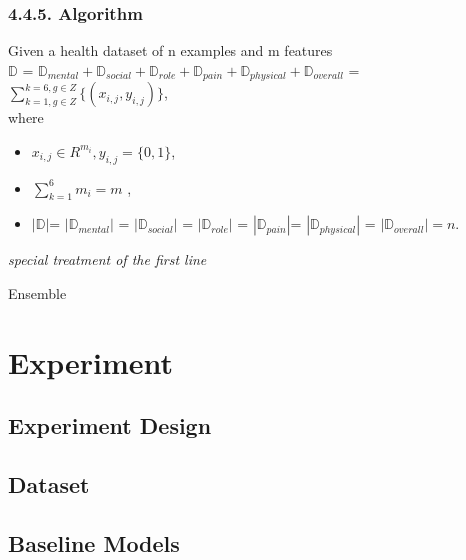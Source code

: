 \documentclass[runningheads]{llncs}
\begin{document}
\subsubsection{4.4.5. Algorithm}
%
Given a health dataset of n examples and m features \\
$\mathbb{D}$ = $\mathbb{D}_{mental} + \mathbb{D}_{social} + \mathbb{D}_{role} + \mathbb{D}_{pain} + \mathbb{D}_{physical} + \mathbb{D}_{overall}$ = $\displaystyle \sum_{k=1, g \in Z}^{k=6, g \in Z}  \big\{ (x_{i, j}, y_{i, j}) \big\}$, \\ where 
 \begin{itemize}
 	\item $ x_{i, j} \in R^{m_{i}}, y_{i, j} = \{0, 1\}$, 
 	\item $\displaystyle \sum_{k=1}^{6}m_{i} = m$ , 
	\item $ |\mathbb{D}| $= $|\mathbb{D}_{mental}|$ = $|\mathbb{D}_{social}|$ = $|\mathbb{D}_{role}|$ = $|\mathbb{D}_{pain}| $= $|\mathbb{D}_{physical}|$ = $|\mathbb{D}_{overall}| =  n$.
 \end{itemize}
%
%
\IncMargin{1em}
\begin{algorithm}
		\BlankLine
		\emph{special treatment of the first line}\;
	\caption{Ensemble}\label{algo_disjdecomp}
\end{algorithm}
\DecMargin{1em}
%
%
%
%
%
%
%
%
%
%
%
%
%
%
%
%
%
%
%
%
%
\pagebreak
\section{Experiment}

\subsection{Experiment Design}

\subsection{Dataset}

\subsection{Baseline Models}
\end{document}
